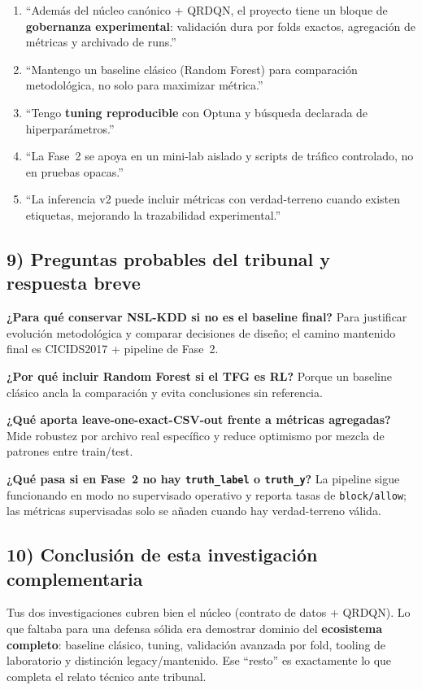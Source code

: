 ﻿\documentclass[12pt,a4paper]{article}
\begin{document}
\begin{enumerate}
  \item ``Además del núcleo canónico + QRDQN, el proyecto tiene un bloque de \textbf{gobernanza
        experimental}: validación dura por folds exactos, agregación de métricas y archivado de
        runs.''
  \item ``Mantengo un baseline clásico (Random Forest) para comparación metodológica, no solo para
        maximizar métrica.''
  \item ``Tengo \textbf{tuning reproducible} con Optuna y búsqueda declarada de hiperparámetros.''
  \item ``La Fase~2 se apoya en un mini-lab aislado y scripts de tráfico controlado, no en pruebas
        opacas.''
  \item ``La inferencia v2 puede incluir métricas con verdad-terreno cuando existen etiquetas,
        mejorando la trazabilidad experimental.''
\end{enumerate}

\subsection{9) Preguntas probables del tribunal y respuesta breve}

\textbf{¿Para qué conservar NSL-KDD si no es el baseline final?}
Para justificar evolución metodológica y comparar decisiones de diseño; el camino mantenido final es
CICIDS2017 + pipeline de Fase~2.

\textbf{¿Por qué incluir Random Forest si el TFG es RL?}
Porque un baseline clásico ancla la comparación y evita conclusiones sin referencia.

\textbf{¿Qué aporta leave-one-exact-CSV-out frente a métricas agregadas?}
Mide robustez por archivo real específico y reduce optimismo por mezcla de patrones entre
train/test.

\textbf{¿Qué pasa si en Fase~2 no hay \texttt{truth\_label} o \texttt{truth\_y}?}
La pipeline sigue funcionando en modo no supervisado operativo y reporta tasas de
\texttt{block/allow}; las métricas supervisadas solo se añaden cuando hay verdad-terreno válida.

\subsection{10) Conclusión de esta investigación complementaria}

Tus dos investigaciones cubren bien el núcleo (contrato de datos + QRDQN). Lo que faltaba para una
defensa sólida era demostrar dominio del \textbf{ecosistema completo}: baseline clásico, tuning,
validación avanzada por fold, tooling de laboratorio y distinción legacy/mantenido. Ese ``resto'' es
exactamente lo que completa el relato técnico ante tribunal.
\end{document}
